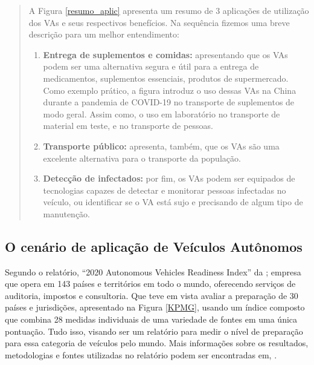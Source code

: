 \begin{quote}

A Figura \ref{resumo_aplic} apresenta um resumo de 3 aplicações de utilização dos VAs e seus respectivos benefícios. Na sequência fizemos uma breve descrição para um melhor entendimento:

\begin{enumerate}
 \item \textbf{Entrega de suplementos e comidas:} apresentando que os VAs podem ser uma alternativa segura e útil para a entrega de medicamentos, suplementos essenciais, produtos de supermercado. Como exemplo prático, a figura introduz o uso dessas VAs na China durante a pandemia de COVID-19 no transporte de suplementos de modo geral. Assim como, o uso em laboratório no transporte de material em teste, e no transporte de pessoas.

\item \textbf{Transporte público:} apresenta, também, que os VAs são uma excelente alternativa para o transporte da população. 

\item \textbf{Detecção de infectados:} por fim, os VAs podem ser equipados de tecnologias capazes de detectar e monitorar pessoas infectadas no veículo, ou identificar se o VA está sujo e precisando de algum tipo de manutenção. 

\end{enumerate}

\end{quote}

\subsection{O cenário de aplicação de Veículos Autônomos}
Segundo o relatório, “2020 Autonomous Vehicles Readiness Index” da \cite{KPMG}; empresa que opera em 143 países e territórios em todo o mundo, oferecendo serviços de auditoria, impostos e consultoria.
Que teve em vista avaliar a preparação de 30 países e jurisdições, apresentado na Figura \ref{KPMG}, usando um índice composto que combina 28 medidas individuais de uma variedade de fontes em uma única pontuação. Tudo isso, visando ser um relatório para medir o nível de preparação para essa categoria de veículos pelo mundo. Mais informações sobre os resultados, metodologias e fontes utilizadas no relatório podem ser encontradas em, \cite{KPMG}.

